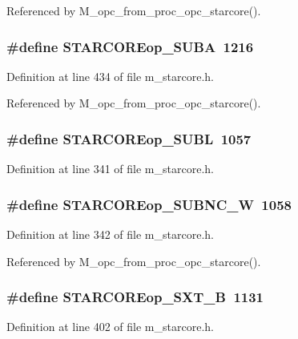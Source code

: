 Referenced by M\_\-opc\_\-from\_\-proc\_\-opc\_\-starcore().
\subsubsection{\setlength{\rightskip}{0pt plus 5cm}\#define STARCOREop\_\-SUBA~1216}\label{m__starcore_8h_0b8aadd768e0729be091622cf814c4c5}




Definition at line 434 of file m\_\-starcore.h.

Referenced by M\_\-opc\_\-from\_\-proc\_\-opc\_\-starcore().
\subsubsection{\setlength{\rightskip}{0pt plus 5cm}\#define STARCOREop\_\-SUBL~1057}\label{m__starcore_8h_b487eba9540e6c9f3effdcea4dbe91ed}




Definition at line 341 of file m\_\-starcore.h.
\subsubsection{\setlength{\rightskip}{0pt plus 5cm}\#define STARCOREop\_\-SUBNC\_\-W~1058}\label{m__starcore_8h_b5bf92c74b4d0bf03aaa30cdf42413f4}




Definition at line 342 of file m\_\-starcore.h.

Referenced by M\_\-opc\_\-from\_\-proc\_\-opc\_\-starcore().
\subsubsection{\setlength{\rightskip}{0pt plus 5cm}\#define STARCOREop\_\-SXT\_\-B~1131}\label{m__starcore_8h_d2f8126603a500deda24e7d1ceb6359d}




Definition at line 402 of file m\_\-starcore.h.

